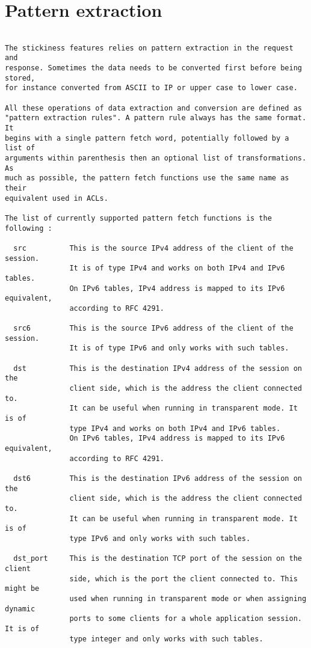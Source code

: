 
\section{Pattern extraction}

\begin{verbatim}

The stickiness features relies on pattern extraction in the request and
response. Sometimes the data needs to be converted first before being stored,
for instance converted from ASCII to IP or upper case to lower case.

All these operations of data extraction and conversion are defined as
"pattern extraction rules". A pattern rule always has the same format. It
begins with a single pattern fetch word, potentially followed by a list of
arguments within parenthesis then an optional list of transformations. As
much as possible, the pattern fetch functions use the same name as their
equivalent used in ACLs.

The list of currently supported pattern fetch functions is the following :

  src          This is the source IPv4 address of the client of the session.
               It is of type IPv4 and works on both IPv4 and IPv6 tables.
               On IPv6 tables, IPv4 address is mapped to its IPv6 equivalent,
               according to RFC 4291.

  src6         This is the source IPv6 address of the client of the session.
               It is of type IPv6 and only works with such tables.

  dst          This is the destination IPv4 address of the session on the
               client side, which is the address the client connected to.
               It can be useful when running in transparent mode. It is of
               type IPv4 and works on both IPv4 and IPv6 tables.
               On IPv6 tables, IPv4 address is mapped to its IPv6 equivalent,
               according to RFC 4291.

  dst6         This is the destination IPv6 address of the session on the
               client side, which is the address the client connected to.
               It can be useful when running in transparent mode. It is of
               type IPv6 and only works with such tables.

  dst_port     This is the destination TCP port of the session on the client
               side, which is the port the client connected to. This might be
               used when running in transparent mode or when assigning dynamic
               ports to some clients for a whole application session. It is of
               type integer and only works with such tables.


\end{verbatim}
